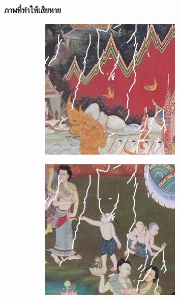 \documentclass[xcolor=dvipsnames, xetex,serif]{beamer}
\numberwithin{equation}{section}
\begin{document}
    \begin{frame}
        \frametitle{ภาพที่ทำให้เสียหาย}
        \begin{figure}[H]
            \centering
            \begin{subfigure}{0.3\linewidth}
                \centering
                \includegraphics[width=0.7\linewidth]{images/thaiart/case01-toinpaint.png}
            \end{subfigure}
            \begin{subfigure}{0.3\linewidth}
                \centering
                \includegraphics[width=0.7\linewidth]{images/thaiart/case02-toinpaint.png}
            \end{subfigure}
            \vspace{1cm}
            \begin{subfigure}{0.3\linewidth}

\end{subfigure}
\end{figure}
\end{frame}
\end{document}
